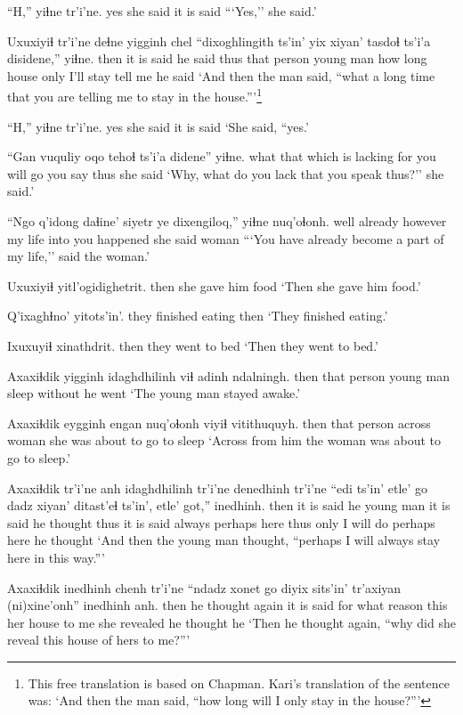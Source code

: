 \documentclass[12pt]{article}
\begin{document}
\gll ``H,''  yiɬne  tr'i'ne.
yes  {she said} {it is said}
\glt ```Yes,'' she said.'
\glend

\gll Uxuxiyiɬ tr'i'ne deɬne  yigginh chel {``dixoghlingith ts'in'} yix xiyan' tasdoɬ ts'i'a disidene,'' yiɬne.
then  {it is said} {he said thus} {that person} {young man} {how long} house only  {I'll stay}  {} {tell me} {he said}
\glt `And then the man said, ``what a long time that you are telling me to stay in the house.'''\footnote{This free translation is based on Chapman. Kari's translation of the sentence was:  `And then the man said, ``how long will I only stay in the house?'''}
\glend

\gll ``H,''  yiɬne  tr'i'ne.
yes  {she said} {it is said}
\glt `She said, ``yes.'
\glend

\gll ``Gan vuquliy oqo tehoɬ  ts'i'a  didene'' yiɬne.
what {that which is lacking} for {you will go} {} {you say thus} {she said}
\glt `Why, what do you lack that you speak thus?'' she said.'
\glend

\gll ``Ngo q'idong daɬine' siyetr ye dixengiloq,''  yiɬne  nuq'oɬonh.
well already  however {my life} into {you happened} {she said} woman
\glt ```You have already become a part of my life,'' said the woman.'
\glend

\gll Uxuxiyiɬ yitl'ogidighetrit.
then  {she gave him food}
\glt `Then she gave him food.'
\glend

\gll Q'ixaghɬno'  yitots'in'.
{they finished eating} then
\glt `They finished eating.'
\glend

\gll Ixuxuyiɬ xinathdrit.
then  {they went to bed}
\glt `Then they went to bed.'
\glend

\gll Axaxiɬdik yigginh idaghdhilinh viɬ adinh  ndalningh.
then  {that person} {young man} sleep without {he went}
\glt `The young man stayed awake.'
\glend

\gll Axaxiɬdik eygginh engan  nuq'oɬonh {viyiɬ vitithuquyh.}
then  {that person} across  woman  {she was about to go to sleep}
\glt `Across from him the woman was about to go to sleep.'
\glend

\gll Axaxiɬdik tr'i'ne anh idaghdhilinh tr'i'ne denedhinh tr'i'ne {``edi ts'in'} etle'  go dadz xiyan' ditast'eɬ ts'in', etle' got,'' inedhinh.
then  {it is said} he {young man} {it is said} {he thought thus} {it is said} always perhaps here thus only {I will do} {}  perhaps here {he thought}
\glt `And then the young man thought, ``perhaps I will always stay here in this way.'''
\glend

\gll Axaxiɬdik inedhinh chenh tr'i'ne {``ndadz xonet} go diyix  sits'in' {tr'axiyan (ni)xine'onh''} inedhinh anh.
then {he thought} again {it is said} {for what reason} this {her house} {to me} {she revealed} {he thought} he
\glt `Then he thought again, ``why did she reveal this house of hers to me?'''
\glend
\end{document}
